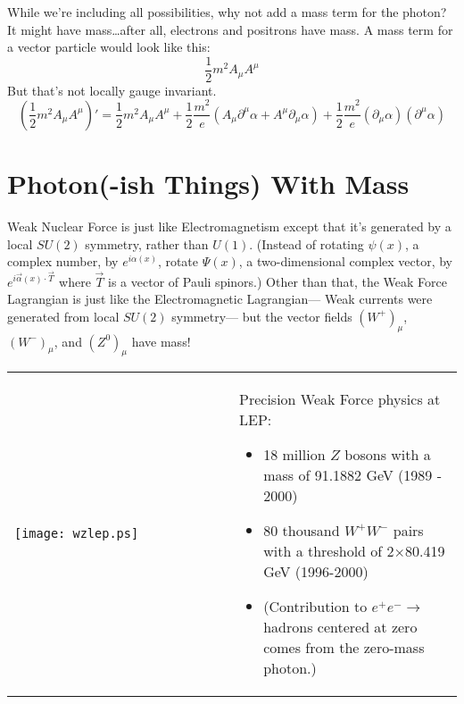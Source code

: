 \documentclass[12pt]{article}
\begin{document}
While we're including all possibilities, why not add a mass term for
the photon?  It might have mass\ldots after all, electrons and
positrons have mass.  A mass term for a vector particle would look
like this:
\begin{equation}
  \frac{1}{2} m^2 A_\mu A^\mu
\end{equation}
But that's not locally gauge invariant.
\begin{equation}
  (\frac{1}{2} m^2 A_\mu A^\mu)' = \frac{1}{2} m^2 A_\mu A^\mu +
  \frac{1}{2} \frac{m^2}{e}(A_\mu \partial^\mu \alpha + A^\mu \partial_\mu \alpha) +
  \frac{1}{2} \frac{m^2}{e}(\partial_\mu \alpha)(\partial^\mu \alpha)
\end{equation}

\section{Photon(-ish Things) With Mass}

Weak Nuclear Force is just like Electromagnetism except that it's
generated by a local $SU(2)$ symmetry, rather than $U(1)$.  (Instead
of rotating $\psi(x)$, a complex number, by $e^{i \alpha(x)}$, rotate
$\Psi(x)$, a two-dimensional complex vector, by $e^{i \vec{\alpha}(x)
\cdot \vec{T}}$ where $\vec{T}$ is a vector of Pauli spinors.)  Other
than that, the Weak Force Lagrangian is just like the Electromagnetic
Lagrangian--- Weak currents were generated from local $SU(2)$
symmetry--- but the vector fields $(W^+)_\mu$, $(W^-)_\mu$, and
$(Z^0)_\mu$ have mass!

\begin{center}
  \begin{tabular}{p{0.5\linewidth} p{0.5\linewidth}}
    \begin{minipage}{\linewidth}
      \texttt{[image: wzlep.ps]}
    \end{minipage} &
    \begin{minipage}{\linewidth}
      Precision Weak Force physics at LEP:
      \begin{itemize}
        \item 18 million $Z$ bosons with a mass of 91.1882 GeV (1989 - 2000)

        \item 80 thousand $W^+W^-$ pairs with a threshold of
              2$\times$80.419 GeV (1996-2000)

	\item (Contribution to $e^+e^- \to$ hadrons centered at zero
              comes from the zero-mass photon.)
      \end{itemize}
    \end{minipage}
  \end{tabular}
\end{center}
\end{document}
